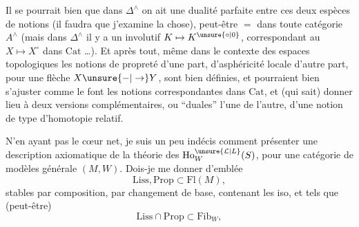 Il se pourrait bien que dans $\Delta^\wedge$ on ait une dualité parfaite entre ces deux espèces de notions (il faudra que j'examine la chose), peut-être $=$ dans toute catégorie $A^\wedge$ (mais dans $\Delta^\wedge$ il y a un  involutif $K\mapsto K^{\unsure{\circ|0}}$, correspondant au $X\mapsto X^\circ$ dans $\mathrm{Cat}$ \ldots).  Et après tout, même dans le contexte des espaces topologiques les notions de propreté d'une part, d'asphéricité locale d'autre part, pour une flèche $X\unsure{-|\to}Y$, sont bien définies, et pourraient bien s'ajuster comme le font les notions correspondantes dans $\mathrm{Cat}$, et (qui sait) donner lieu à deux versions complémentaires, ou ``duales'' l'une de l'autre, d'une notion de type d'homotopie relatif.

N'en ayant pas le cœur net, je suis un peu indécis comment présenter une description axiomatique de la théorie des $\mathrm{Ho}^{\unsure{\mathcal L|L}}_W(S)$, pour une  catégorie de modèles générale $(M,W)$. Dois-je me donner d'emblée
\[
\mathrm{Liss},\mathrm{Prop}\subset\mathrm{Fl}(M),
\]
 stables par composition, par changement de base, contenant les iso, et tels que (peut-être)
\[
\mathrm{Liss}\cap\mathrm{Prop}\subset\mathrm{Fib}_W,
\]

